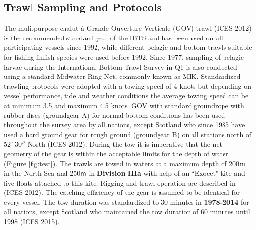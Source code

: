 \documentclass[a4paper 12pt]{article}
\numberwithin{equation}{section}
\newcommand{\m}{\textnormal{\sffamily m}\xspace}
\begin{document}
%
%
%

\subsection{Trawl Sampling and Protocols}
\label{trawlproto}
The mulitpurpose chalut {\`a} Grande Ouverture Verticale (GOV) trawl (ICES 2012) is the recommended standard gear of the IBTS and has been used on all participating vessels since 1992, while different pelagic and bottom trawls suitable for fishing finfish species were used before 1992. Since 1977, sampling of pelagic larvae during the International Bottom Trawl Survey in Q1 is also conducted using a  standard Midwater Ring Net, commonly known as MIK. Standardized trawling protocols were adopted with a towing speed of 4 knots but depending on vessel performance, tide and weather conditions the average towing speed can be at minimum 3.5 and maximum 4.5 knots. GOV with standard groundrope with rubber discs (groundgear A) for normal bottom conditions has been used throughout the survey area by all nations, except Scotland who since 1985 have used a hard ground gear for rough ground (groundgear B) on all stations north of   $52^\circ  \ 30''$ North  (ICES 2012). During the tow it is imperative that the net geometry of the gear is within the acceptable limits for the depth of water (Figure \ref{fig:test}). The trawls are towed in waters at a maximum depth of 200$\m$ in the North Sea and 250$\m$ in {\bf Division IIIa} with help of an ``Exocet"  kite and five floats attached to this kite. Rigging and trawl operation are described in (ICES 2012). The catching efficiency of the gear is assumed to be identical for every vessel. The tow duration was standardized to 30 minutes in {\bf 1978-2014} for all nations, except Scotland who maintained the tow duration of 60 minutes until 1998 (ICES 2015).  \\
\end{document}
